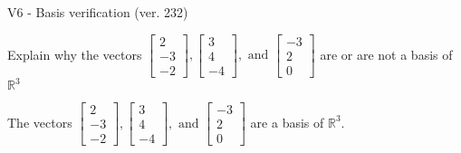 \begin{exercise}
  \begin{exerciseTitle}V6 - Basis verification (ver. 232)\end{exerciseTitle}
  \begin{exerciseStatement}
    Explain why the vectors \(\left[\begin{array}{r}
2 \\
-3 \\
-2
\end{array}\right] , \left[\begin{array}{r}
3 \\
4 \\
-4
\end{array}\right] , \text{ and } \left[\begin{array}{r}
-3 \\
2 \\
0
\end{array}\right]\) are or are not a basis of \(\mathbb{R}^3\)	


  \end{exerciseStatement}
  \begin{exerciseAnswer}
   The vectors \(\left[\begin{array}{r}
2 \\
-3 \\
-2
\end{array}\right] , \left[\begin{array}{r}
3 \\
4 \\
-4
\end{array}\right] , \text{ and } \left[\begin{array}{r}
-3 \\
2 \\
0
\end{array}\right]\) 
  	 are  a basis of \(\mathbb{R}^3\).
  


  \end{exerciseAnswer}
\end{exercise}
